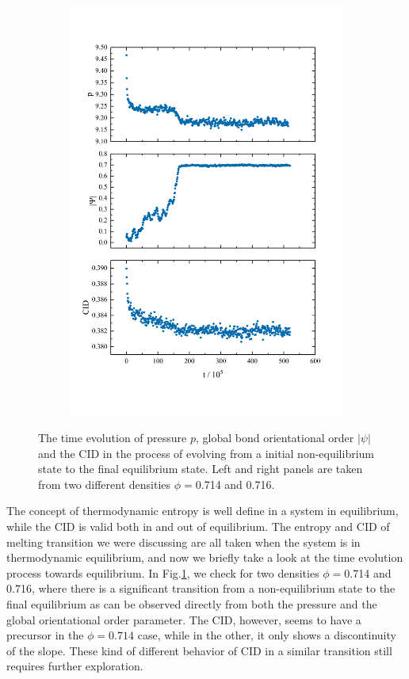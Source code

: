 \documentclass[a4paper]{article}
\begin{document}
\begin{figure}[ht]
\begin{subfigure}[ht]{.5\textwidth}
		\includegraphics[width=1\columnwidth]{t_evo_716.png}
	\end{subfigure}
	\caption{
		The time evolution of pressure $p$, global bond orientational order $|\psi|$ and the CID in the process of evolving from a initial non-equilibrium state to the final equilibrium state. Left and right panels are taken from two different densities $\phi=$0.714 and 0.716.
	}
	\label{fig:t_evo}
\end{figure}

The concept of thermodynamic entropy is well define in a system in equilibrium, while the CID is valid both in and out of equilibrium. The entropy and CID of melting transition we were discussing are all taken when the system is in thermodynamic equilibrium, and now we briefly take a look at the time evolution process towards equilibrium. In Fig.\ref{fig:t_evo}, we check for two densities $\phi=$0.714 and 0.716, where there is a significant transition from a non-equilibrium state to the final equilibrium as can be observed directly from both the pressure and the global orientational order parameter. The CID, however, seems to have a precursor in the $\phi=0.714$ case, while in the other, it only shows a discontinuity of the slope. These kind of different behavior of CID in a similar transition still requires further exploration.
\end{document}
